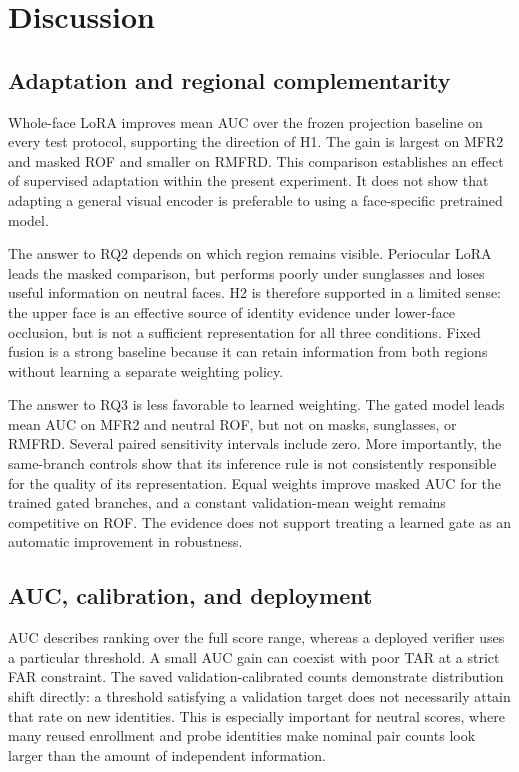 \documentclass[10pt,journal,compsoc]{IEEEtran}
\begin{document}
\section{Discussion}
\subsection{Adaptation and regional complementarity}
Whole-face LoRA improves mean AUC over the frozen projection baseline on every test protocol, supporting the direction of H1. The gain is largest on MFR2 and masked ROF and smaller on RMFRD. This comparison establishes an effect of supervised adaptation within the present experiment. It does not show that adapting a general visual encoder is preferable to using a face-specific pretrained model.

The answer to RQ2 depends on which region remains visible. Periocular LoRA leads the masked comparison, but performs poorly under sunglasses and loses useful information on neutral faces. H2 is therefore supported in a limited sense: the upper face is an effective source of identity evidence under lower-face occlusion, but is not a sufficient representation for all three conditions. Fixed fusion is a strong baseline because it can retain information from both regions without learning a separate weighting policy.

The answer to RQ3 is less favorable to learned weighting. The gated model leads mean AUC on MFR2 and neutral ROF, but not on masks, sunglasses, or RMFRD. Several paired sensitivity intervals include zero. More importantly, the same-branch controls show that its inference rule is not consistently responsible for the quality of its representation. Equal weights improve masked AUC for the trained gated branches, and a constant validation-mean weight remains competitive on ROF. The evidence does not support treating a learned gate as an automatic improvement in robustness.

\subsection{AUC, calibration, and deployment}
AUC describes ranking over the full score range, whereas a deployed verifier uses a particular threshold. A small AUC gain can coexist with poor TAR at a strict FAR constraint. The saved validation-calibrated counts demonstrate distribution shift directly: a threshold satisfying a validation target does not necessarily attain that rate on new identities. This is especially important for neutral scores, where many reused enrollment and probe identities make nominal pair counts look larger than the amount of independent information.
\end{document}
